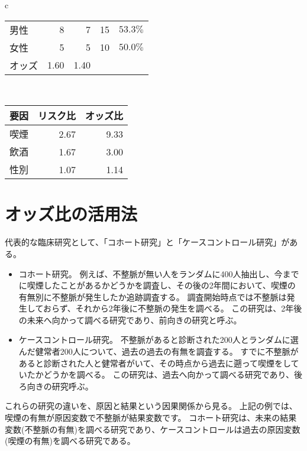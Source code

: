 \documentclass{ltjsarticle}
\begin{document}
\begin{table}[b]
\begin{tabular}{c}
\begin{minipage}{0.4\hsize}
\begin{tabular}{l|r|r|r|r}
                男性 & 8 & 7 & 15 & $53.3\%$ \\
                女性 & 5 & 5 & 10 & $50.0\%$ \\ \hline 
                オッズ & 1.60 & 1.40 & \multicolumn{2}{|l}{} \\ \hline
            \end{tabular}
        \end{minipage} \\
        \begin{minipage}{0.4\hsize}
            \centering
            \begin{tabular}{l|r|r} \hline 
                要因& \multicolumn{1}{|l|}{リスク比} & \multicolumn{1}{l}{オッズ比} \\\hline \hline
                喫煙& 2.67 & 9.33  \\
                飲酒& 1.67 & 3.00 \\
                性別& 1.07 & 1.14 \\ \hline 
            \end{tabular}
        \end{minipage}

    \end{tabular}
\end{table}

\section{オッズ比の活用法}
代表的な臨床研究として、「コホート研究」と「ケースコントロール研究」がある。

\begin{itemize}
    \item コホート研究。
          例えば、不整脈が無い人をランダムに400人抽出し、今までに喫煙したことがあるかどうかを調査し、その後の2年間において、喫煙の有無別に不整脈が発生したか追跡調査する。
          調査開始時点では不整脈は発生しておらず、それから2年後に不整脈の発生を調べる。
          この研究は、2年後の未来へ向かって調べる研究であり、前向きの研究と呼ぶ。
    \item ケースコントロール研究。
          不整脈があると診断された200人とランダムに選んだ健常者200人について、過去の過去の有無を調査する。
          すでに不整脈があると診断された人と健常者がいて、その時点から過去に遡って喫煙をしていたかどうかを調べる。
          この研究は、過去へ向かって調べる研究であり、後ろ向きの研究呼ぶ。
\end{itemize}
これらの研究の違いを、原因と結果という因果関係から見る。
上記の例では、喫煙の有無が原因変数で不整脈が結果変数です。
コホート研究は、未来の結果変数(不整脈の有無)を調べる研究であり、ケースコントロールは過去の原因変数(喫煙の有無)を調べる研究である。
\end{document}
